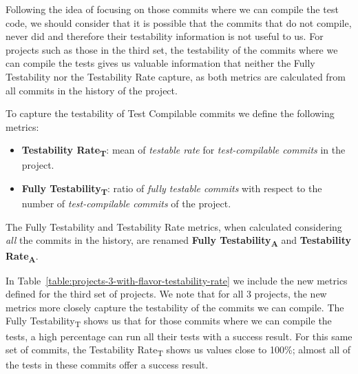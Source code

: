 Following the idea of focusing on those commits where we can compile the test code, we should consider that it is possible that the commits that do not compile, never did and therefore their testability information is not useful to us.
For projects such as those in the third set, the testability of the commits where we can compile the tests gives us valuable information that neither the Fully Testability nor the Testability Rate capture, as both metrics are calculated from all commits in the history of the project.

To capture the testability of Test Compilable commits we define the following metrics:
\begin{itemize}
    \item \textbf{Testability Rate\textsubscript{T}}: mean of \textit{testable rate} for \textit{test-compilable commits} in the project.
    \item \textbf{Fully Testability\textsubscript{T}}: ratio of \textit{fully testable commits} with respect to the number of \textit{test-compilable commits} of the project.
\end{itemize}
The Fully Testability and Testability Rate metrics, when calculated considering \textit{all} the commits in the history, are renamed \textbf{Fully Testability\textsubscript{A}} and \textbf{Testability Rate\textsubscript{A}}.

In Table~\ref{table:projects-3-with-flavor-testability-rate} we include the new metrics defined for the third set of projects. 
We note that for all 3 projects, the new metrics more closely capture the testability of the commits we can compile.
The Fully Testability\textsubscript{T} shows us that for those commits where we can compile the tests, a high percentage can run all their tests with a success result. For this same set of commits, the Testability Rate\textsubscript{T} shows us values close to 100\%; almost all of the tests in these commits offer a success result.

